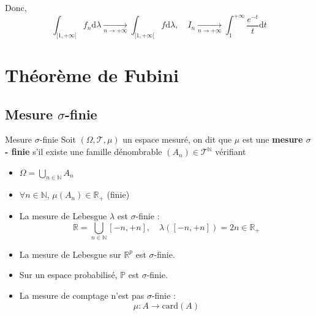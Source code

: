\begin{solution}
\begin{itemize}
\begin{itemize}
    \end{itemize}
    Donc,
    \begin{equation}
      \int_{[1, +\infty[}^{}f_n \mathrm{d}\lambda  \underset{n \to + \infty}{\longrightarrow}  \int_{[1, + \infty[}^{} f \mathrm{d}\lambda,\quad I_n  \underset{n \to + \infty}{\longrightarrow} \int_{1}^{+ \infty} \frac{e ^{-t}}{t}  \mathrm{d}t
    \end{equation}



  \end{itemize}
\end{solution}

\newpage
\section{Théorème de Fubini} %
\label{sec:Théorème de Fubini}



\subsection{Mesure $\sigma$-finie} %

\begin{Definition}[colbacktitle=red!75!black]{Mesure $\sigma$-finie}{}
Soit $(\Omega, \mathcal{T}, \mu)$ un espace mesuré, on dit que $\mu$ est une \textbf{mesure $\sigma$- finie} s'il existe une famille dénombrable $(A_n) \in \mathcal{T} ^{\mathbb{N}}$ vérifiant 
\begin{itemize}

    \item $\Omega = \bigcup _{n \in \mathbb{N}} A_n$ 
    \item $\forall n \in \mathbb{N}$, $\mu(A_n) \in \mathbb{R} _+$ (finie)

\end{itemize}
\end{Definition}


\begin{Example}{}{}
\begin{itemize}

    \item La mesure de Lebesgue $\lambda$ est $\sigma$-finie : 
      \begin{equation}
        \mathbb{R} = \bigcup _{n \in \mathbb{N}} [-n, +n], \quad \lambda([-n, +n]) = 2n \in \mathbb{R}_+
      \end{equation}

    \item La mesure de Lebesgue sur $\mathbb{R} ^{p}$  est $\sigma$-finie.
    \item Sur un espace probabilisé, $\mathbb{P}$ est $\sigma$-finie. 

    \item La mesure de comptage n'est pas $\sigma$-finie : 
      \begin{equation}
        \mu : A \to \mathrm{card}(A)
      \end{equation}

\end{itemize}
\end{Example}

